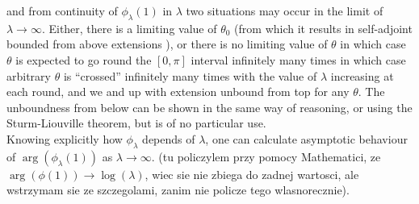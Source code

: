 and from continuity of $\phi_\lambda(1)$ in $\lambda$ two situations
may occur in the limit of $\lambda\rightarrow\infty$. Either, there is
a limiting value of $\theta_0$ (from which it results in self-adjoint
bounded from above extensions ), or there is no limiting value of
$\theta$ in which case $\theta$ is expected to go round the $[0,\pi]$
interval infinitely many times in which case arbitrary $\theta$ is
``crossed'' infinitely many times with the value of $\lambda$
increasing at each round, and we and up with extension unbound from
top for any $\theta$. The unboundness from below can be shown in the
same way of reasoning, or using the Sturm-Liouville theorem, but is of
no particular use.
\\
Knowing explicitly how $\phi_\lambda$ depends of $\lambda$, one can
calculate asymptotic behaviour of $\arg(\phi_\lambda(1))$ as
$\lambda\rightarrow\infty$. (tu policzylem przy pomocy Mathematici, ze
$\arg(\phi(1))\rightarrow\log(\lambda)$, wiec sie nie zbiega do zadnej
wartosci, ale wstrzymam sie ze szczegolami, zanim nie policze tego
wlasnorecznie).

